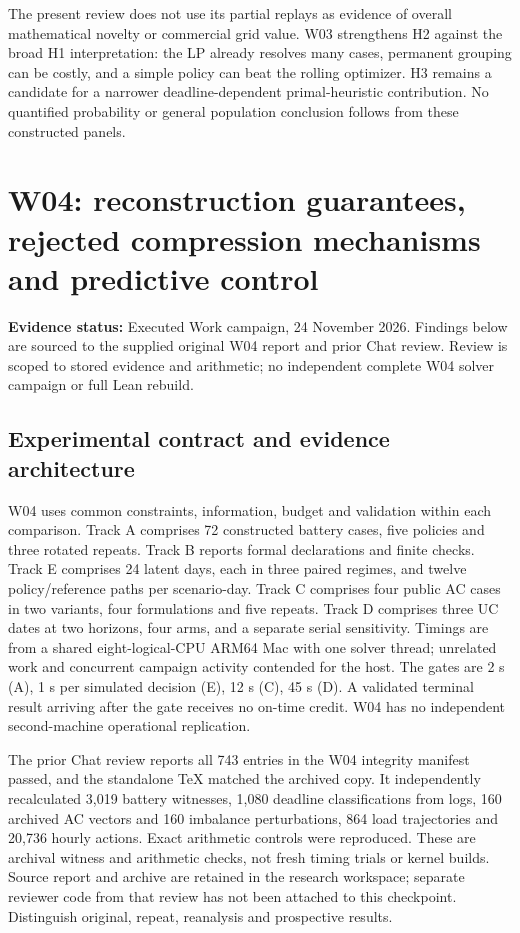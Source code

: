 \documentclass[11pt,letterpaper]{article}
\newcommand{\status}[1]{\textbf{Evidence status:} #1}
\begin{document}
The present review does not use its partial replays as evidence of overall mathematical novelty or commercial grid value. W03 strengthens H2 against the broad H1 interpretation: the LP already resolves many cases, permanent grouping can be costly, and a simple policy can beat the rolling optimizer. H3 remains a candidate for a narrower deadline-dependent primal-heuristic contribution. No quantified probability or general population conclusion follows from these constructed panels.


\section{W04: reconstruction guarantees, rejected compression mechanisms and predictive control}
\label{sec:w04results}
\status{Executed Work campaign, 24 November 2026. Findings below are sourced to the supplied original W04 report and prior Chat review. Review is scoped to stored evidence and arithmetic; no independent complete W04 solver campaign or full Lean rebuild.}\cite{w04packet}

\subsection{Experimental contract and evidence architecture}
W04 uses common constraints, information, budget and validation within each comparison. Track A comprises 72 constructed battery cases, five policies and three rotated repeats. Track B reports formal declarations and finite checks. Track E comprises 24 latent days, each in three paired regimes, and twelve policy/reference paths per scenario-day. Track C comprises four public AC cases in two variants, four formulations and five repeats. Track D comprises three UC dates at two horizons, four arms, and a separate serial sensitivity. Timings are from a shared eight-logical-CPU ARM64 Mac with one solver thread; unrelated work and concurrent campaign activity contended for the host. The gates are 2 s (A), 1 s per simulated decision (E), 12 s (C), 45 s (D). A validated terminal result arriving after the gate receives no on-time credit. W04 has no independent second-machine operational replication.

The prior Chat review reports all 743 entries in the W04 integrity manifest passed, and the standalone TeX matched the archived copy. It independently recalculated 3,019 battery witnesses, 1,080 deadline classifications from logs, 160 archived AC vectors and 160 imbalance perturbations, 864 load trajectories and 20,736 hourly actions. Exact arithmetic controls were reproduced. These are archival witness and arithmetic checks, not fresh timing trials or kernel builds. Source report and archive are retained in the research workspace; separate reviewer code from that review has not been attached to this checkpoint. Distinguish original, repeat, reanalysis and prospective results.
\end{document}
